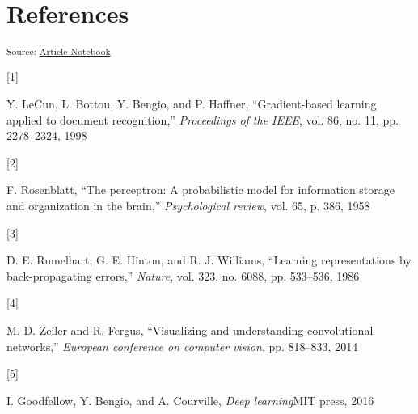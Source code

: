 \documentclass[
  11pt,
  twocolumn,
  a4paper]{article}
\newlength{\cslhangindent}
\newlength{\csllabelwidth}
\newenvironment{CSLReferences}[2] %
 {\begin{list}{}{%
  \setlength{\itemindent}{0pt}
  \setlength{\leftmargin}{0pt}
  \setlength{\parsep}{0pt}
  \ifodd #1
   \setlength{\leftmargin}{\cslhangindent}
   \setlength{\itemindent}{-1\cslhangindent}
  \fi
  \setlength{\itemsep}{#2\baselineskip}}}
 {\end{list}}
\newcommand{\CSLLeftMargin}[1]{\parbox[t]{\csllabelwidth}{\strut#1\strut}}
\newcommand{\CSLRightInline}[1]{\parbox[t]{\linewidth - \csllabelwidth}{\strut#1\strut}}
\begin{document}
\section{References}\label{references}

\textsubscript{Source:
\href{https://Jing-yilin.github.io/mnist/index.qmd.html}{Article
Notebook}}

\label{refs}
\begin{CSLReferences}{0}{0}
\CSLLeftMargin{{[}1{]} }%
\CSLRightInline{Y. LeCun, L. Bottou, Y. Bengio, and P. Haffner,
{``Gradient-based learning applied to document recognition,''}
\emph{Proceedings of the IEEE}, vol. 86, no. 11, pp. 2278--2324, 1998}

\CSLLeftMargin{{[}2{]} }%
\CSLRightInline{F. Rosenblatt, {``The perceptron: A probabilistic model
for information storage and organization in the brain,''}
\emph{Psychological review}, vol. 65, p. 386, 1958}

\CSLLeftMargin{{[}3{]} }%
\CSLRightInline{D. E. Rumelhart, G. E. Hinton, and R. J. Williams,
{``Learning representations by back-propagating errors,''}
\emph{Nature}, vol. 323, no. 6088, pp. 533--536, 1986}

\CSLLeftMargin{{[}4{]} }%
\CSLRightInline{M. D. Zeiler and R. Fergus, {``Visualizing and
understanding convolutional networks,''} \emph{European conference on
computer vision}, pp. 818--833, 2014}

\CSLLeftMargin{{[}5{]} }%
\CSLRightInline{I. Goodfellow, Y. Bengio, and A. Courville, \emph{Deep
learning}MIT press, 2016}

\end{CSLReferences}
\end{document}
